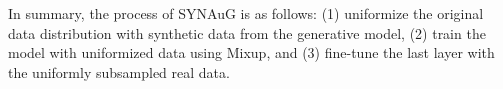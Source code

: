 In summary, the process of SYNAuG is as follows:
(1) uniformize the original data distribution with synthetic data from the generative model, (2) train the model with uniformized data using Mixup, and (3) fine-tune the last layer with the uniformly subsampled real data.


